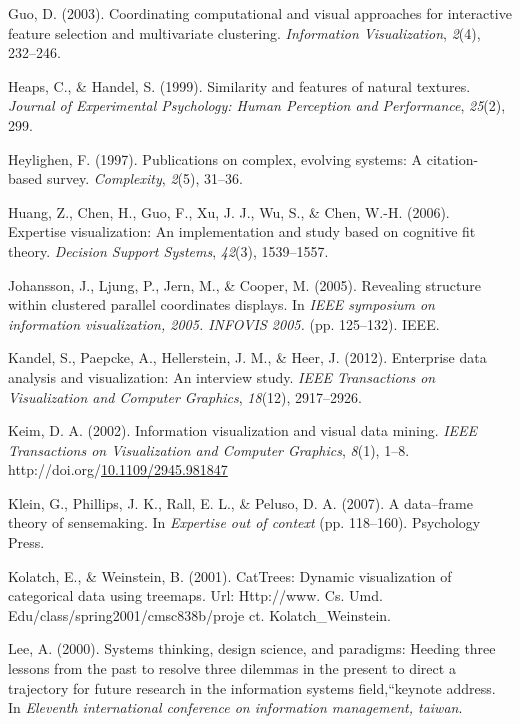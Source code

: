 \documentclass[print]{nuthesis}
\newlength{\cslhangindent}
\newenvironment{CSLReferences}[2]%
{\setlength{\parindent}{0pt}%
\everypar{\setlength{\hangindent}{\cslhangindent}}\ignorespaces}%
{\par}
\begin{document}
\begin{CSLReferences}{1}{0}
\leavevmode\hypertarget{ref-guo2003}{}%
Guo, D. (2003). Coordinating computational and visual approaches for interactive feature selection and multivariate clustering. \emph{Information Visualization}, \emph{2}(4), 232--246.

\leavevmode\hypertarget{ref-heaps1999}{}%
Heaps, C., \& Handel, S. (1999). Similarity and features of natural textures. \emph{Journal of Experimental Psychology: Human Perception and Performance}, \emph{25}(2), 299.

\leavevmode\hypertarget{ref-heylighen1997}{}%
Heylighen, F. (1997). Publications on complex, evolving systems: A citation-based survey. \emph{Complexity}, \emph{2}(5), 31--36.

\leavevmode\hypertarget{ref-huang2006}{}%
Huang, Z., Chen, H., Guo, F., Xu, J. J., Wu, S., \& Chen, W.-H. (2006). Expertise visualization: An implementation and study based on cognitive fit theory. \emph{Decision Support Systems}, \emph{42}(3), 1539--1557.

\leavevmode\hypertarget{ref-johansson2005}{}%
Johansson, J., Ljung, P., Jern, M., \& Cooper, M. (2005). Revealing structure within clustered parallel coordinates displays. In \emph{IEEE symposium on information visualization, 2005. INFOVIS 2005.} (pp. 125--132). IEEE.

\leavevmode\hypertarget{ref-kandel2012}{}%
Kandel, S., Paepcke, A., Hellerstein, J. M., \& Heer, J. (2012). Enterprise data analysis and visualization: An interview study. \emph{IEEE Transactions on Visualization and Computer Graphics}, \emph{18}(12), 2917--2926.

\leavevmode\hypertarget{ref-kiem2002}{}%
Keim, D. A. (2002). Information visualization and visual data mining. \emph{IEEE Transactions on Visualization and Computer Graphics}, \emph{8}(1), 1--8. http://doi.org/\href{https://doi.org/10.1109/2945.981847}{10.1109/2945.981847}

\leavevmode\hypertarget{ref-klein2007}{}%
Klein, G., Phillips, J. K., Rall, E. L., \& Peluso, D. A. (2007). A data--frame theory of sensemaking. In \emph{Expertise out of context} (pp. 118--160). Psychology Press.

\leavevmode\hypertarget{ref-kolatch2001}{}%
Kolatch, E., \& Weinstein, B. (2001). CatTrees: Dynamic visualization of categorical data using treemaps. Url: Http://www. Cs. Umd. Edu/class/spring2001/cmsc838b/proje ct. Kolatch\_Weinstein.

\leavevmode\hypertarget{ref-lee2000}{}%
Lee, A. (2000). Systems thinking, design science, and paradigms: Heeding three lessons from the past to resolve three dilemmas in the present to direct a trajectory for future research in the information systems field,``keynote address. In \emph{Eleventh international conference on information management, taiwan}.


\end{CSLReferences}
\end{document}
